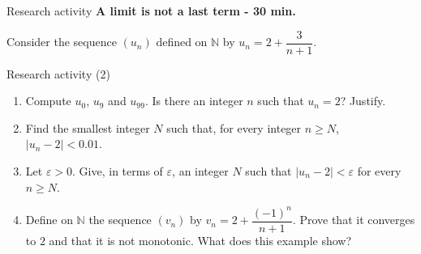\documentclass[aspectratio=169,10pt]{beamer}
\providecommand{\N}{\mathbb{N}}
\begin{document}
\begin{frame}{Research activity}
\textbf{A limit is not a last term - 30 min.}

Consider the sequence \((u_n)\) defined on \(\N\) by \(u_n=2+\dfrac3{n+1}\).
\end{frame}
\begin{frame}{Research activity (2)}
\begin{enumerate}
\setcounter{enumi}{0}\item Compute \(u_0\), \(u_9\) and \(u_{99}\). Is there an integer \(n\) such that \(u_n=2\)? Justify.

\item Find the smallest integer \(N\) such that, for every integer \(n\ge N\), \(|u_n-2|<0.01\).

\item Let \(\varepsilon>0\). Give, in terms of \(\varepsilon\), an integer \(N\) such that \(|u_n-2|<\varepsilon\) for every \(n\ge N\).

\item Define on \(\N\) the sequence \((v_n)\) by \(v_n=2+\dfrac{(-1)^n}{n+1}\). Prove that it converges to \(2\) and that it is not monotonic. What does this example show?

\end{enumerate}
\end{frame}
\end{document}
